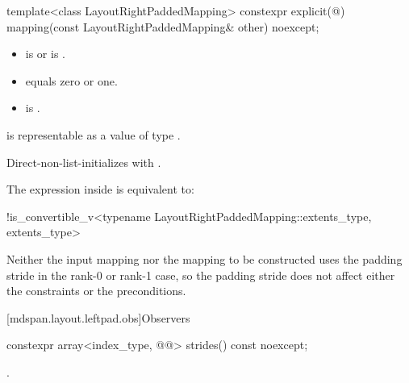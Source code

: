 %
\begin{itemdecl}
template<class LayoutRightPaddedMapping>
  constexpr explicit(@\seebelow@)
    mapping(const LayoutRightPaddedMapping& other) noexcept;
\end{itemdecl}

\begin{itemdescr}
\pnum
\constraints
\begin{itemize}
\item
{}
is  or\newline
{}
is .
\item
{} equals zero or one.
\item
{}
is .
\end{itemize}

\pnum
\expects
{} is representable as
a value of type .

\pnum
\effects
Direct-non-list-initializes  with .

\pnum
\remarks
The expression inside  is equivalent to:
\begin{codeblock}
!is_convertible_v<typename LayoutRightPaddedMapping::extents_type, extents_type>
\end{codeblock}

\begin{note}
Neither the input mapping nor the mapping to be constructed
uses the padding stride in the rank-0 or rank-1 case,
so the padding stride does not affect
either the constraints or the preconditions.
\end{note}
\end{itemdescr}

[mdspan.layout.leftpad.obs]{Observers}

\begin{itemdecl}
constexpr array<index_type, @@> strides() const noexcept;
\end{itemdecl}

\begin{itemdescr}
\pnum
\returns
{}.
\end{itemdescr}


